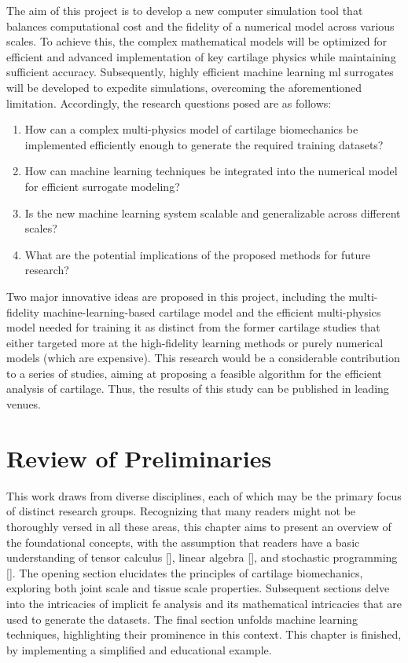 \documentclass[12pt,a4paper]{report}
\begin{document}
The aim of this project is to develop a new computer simulation tool that balances computational cost and the fidelity of a numerical model across various scales. To achieve this, the complex mathematical models will be optimized for efficient and advanced implementation of key cartilage physics while maintaining sufficient accuracy. Subsequently, highly efficient machine learning \ac{ml} surrogates will be developed to expedite simulations, overcoming the aforementioned limitation. Accordingly, the research questions posed are as follows:
%
\begin{enumerate}
    \item How can a complex multi-physics model of cartilage biomechanics be implemented efficiently enough to generate the required training datasets?
    \item How can machine learning techniques be integrated into the numerical model for efficient surrogate modeling?
    \item Is the new machine learning system scalable and generalizable across different scales?
    \item What are the potential implications of the proposed methods for future research?
\end{enumerate}


Two major innovative ideas are proposed in this project, including the multi-fidelity machine-learning-based cartilage model and the efficient multi-physics model needed for training it as distinct from the former cartilage studies that either targeted more at the high-fidelity learning methods or purely numerical models (which are expensive). This research would be a considerable contribution to a series of studies, aiming at proposing a feasible algorithm for the efficient analysis of cartilage. Thus, the results of this study can be published in leading venues.


\chapter{Review of Preliminaries}
This work draws from diverse disciplines, each of which may be the primary focus of distinct research groups. Recognizing that many readers might not be thoroughly versed in all these areas, this chapter aims to present an overview of the foundational concepts, with the assumption that readers have a basic understanding of tensor calculus [\cite{fleisch2011}], linear algebra [\cite{strang2023}], and stochastic programming [\cite{birge2011}]. The opening section elucidates the principles of cartilage biomechanics, exploring both joint scale and tissue scale properties. Subsequent sections delve into the intricacies of implicit \ac{fe} analysis and its mathematical intricacies that are used to generate the datasets. The final section unfolds machine learning techniques, highlighting their prominence in this context. This chapter is finished, by implementing a simplified and educational example.
\end{document}
